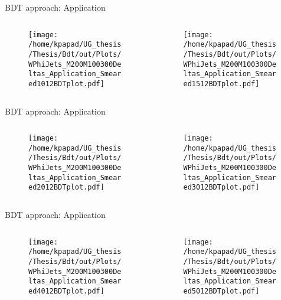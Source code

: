 \documentclass[bigger]{beamer}
\begin{document}
\begin{frame}[label={sec:orga2c75c9}]{BDT approach: Application}
\begin{columns}
\begin{column}{0.5\columnwidth}
\begin{figure}[h]
\centering
\texttt{[image: /home/kpapad/UG\_thesis/Thesis/Bdt/out/Plots/WPhiJets\_M200M100300Deltas\_Application\_Smeared1012BDTplot.pdf]}
\end{figure}
\end{column}
\begin{column}{0.5\columnwidth}
\begin{figure}[h]
\centering
\texttt{[image: /home/kpapad/UG\_thesis/Thesis/Bdt/out/Plots/WPhiJets\_M200M100300Deltas\_Application\_Smeared1512BDTplot.pdf]}
\end{figure}
\end{column}
\end{columns}
\end{frame}

\begin{frame}[label={sec:orgc641691}]{BDT approach: Application}
\begin{columns}
\begin{column}{0.5\columnwidth}
\begin{figure}[h]
\centering
\texttt{[image: /home/kpapad/UG\_thesis/Thesis/Bdt/out/Plots/WPhiJets\_M200M100300Deltas\_Application\_Smeared2012BDTplot.pdf]}
\end{figure}
\end{column}
\begin{column}{0.5\columnwidth}
\begin{figure}[h]
\centering
\texttt{[image: /home/kpapad/UG\_thesis/Thesis/Bdt/out/Plots/WPhiJets\_M200M100300Deltas\_Application\_Smeared3012BDTplot.pdf]}
\end{figure}
\end{column}
\end{columns}
\end{frame}

\begin{frame}[label={sec:orgc369b50}]{BDT approach: Application}
\begin{columns}
\begin{column}{0.5\columnwidth}
\begin{figure}[h]
\centering
\texttt{[image: /home/kpapad/UG\_thesis/Thesis/Bdt/out/Plots/WPhiJets\_M200M100300Deltas\_Application\_Smeared4012BDTplot.pdf]}
\end{figure}
\end{column}
\begin{column}{0.5\columnwidth}
\begin{figure}[h]
\centering
\texttt{[image: /home/kpapad/UG\_thesis/Thesis/Bdt/out/Plots/WPhiJets\_M200M100300Deltas\_Application\_Smeared5012BDTplot.pdf]}
\end{figure}
\end{column}
\end{columns}
\end{frame}
\end{document}
